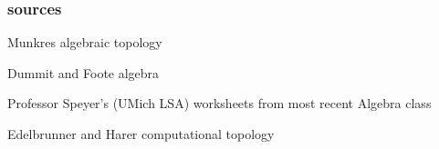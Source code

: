 \documentclass{beamer}
\begin{document}
\begin{frame}
  \frametitle{sources}

  Munkres algebraic topology

  Dummit and Foote algebra

  Professor Speyer's (UMich LSA) worksheets from most recent Algebra class \hyperlink{https://dept.math.lsa.umich.edu/~speyer/593/593_Worksheets_2021_Public.pdf}{}

  Edelbrunner and Harer computational topology

\end{frame}
\end{document}

